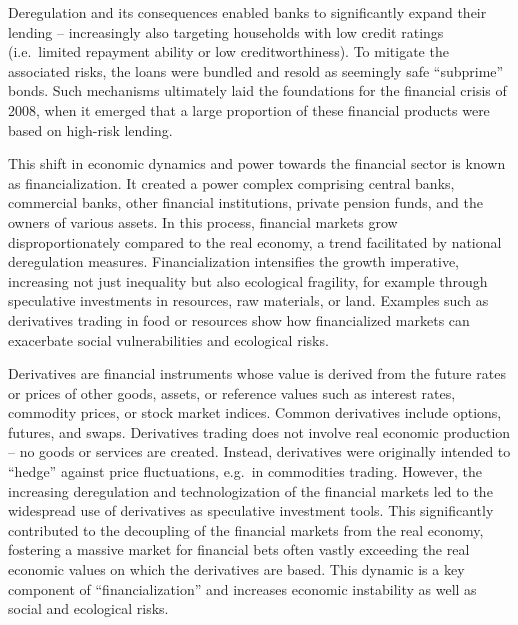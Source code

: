 \documentclass[
  a4paper,
  DIV=11,
  numbers=noendperiod,
  oneside,
  openany]{scrreprt}
\begin{document}
Deregulation and its consequences enabled banks to significantly expand
their lending -- increasingly also targeting households with low credit
ratings (i.e.~limited repayment ability or low creditworthiness). To
mitigate the associated risks, the loans were bundled and resold as
seemingly safe ``subprime'' bonds. Such mechanisms ultimately laid the
foundations for the financial crisis of 2008, when it emerged that a
large proportion of these financial products were based on high-risk
lending.

This shift in economic dynamics and power towards the financial sector
is known as financialization. It created a power complex comprising
central banks, commercial banks, other financial institutions, private
pension funds, and the owners of various assets. In this process,
financial markets grow disproportionately compared to the real economy,
a trend facilitated by national deregulation measures. Financialization
intensifies the growth imperative, increasing not just inequality but
also ecological fragility, for example through speculative investments
in resources, raw materials, or land. Examples such as derivatives
trading in food or resources show how financialized markets can
exacerbate social vulnerabilities and ecological risks.

\begin{tcolorbox}[enhanced jigsaw, arc=.35mm, bottomrule=.15mm, bottomtitle=1mm, breakable, colback=white, colbacktitle=quarto-callout-note-color!10!white, colframe=quarto-callout-note-color-frame, coltitle=black, left=2mm, leftrule=.75mm, opacityback=0, opacitybacktitle=0.6, rightrule=.15mm, title={What are derivatives and how do they contribute to financialization?}, titlerule=0mm, toprule=.15mm, toptitle=1mm]

Derivatives are financial instruments whose value is derived from the
future rates or prices of other goods, assets, or reference values such
as interest rates, commodity prices, or stock market indices. Common
derivatives include options, futures, and swaps. Derivatives trading
does not involve real economic production -- no goods or services are
created. Instead, derivatives were originally intended to ``hedge''
against price fluctuations, e.g.~in commodities trading. However, the
increasing deregulation and technologization of the financial markets
led to the widespread use of derivatives as speculative investment
tools. This significantly contributed to the decoupling of the financial
markets from the real economy, fostering a massive market for financial
bets often vastly exceeding the real economic values on which the
derivatives are based. This dynamic is a key component of
``financialization'' and increases economic instability as well as
social and ecological risks.

\end{tcolorbox}
\end{document}
